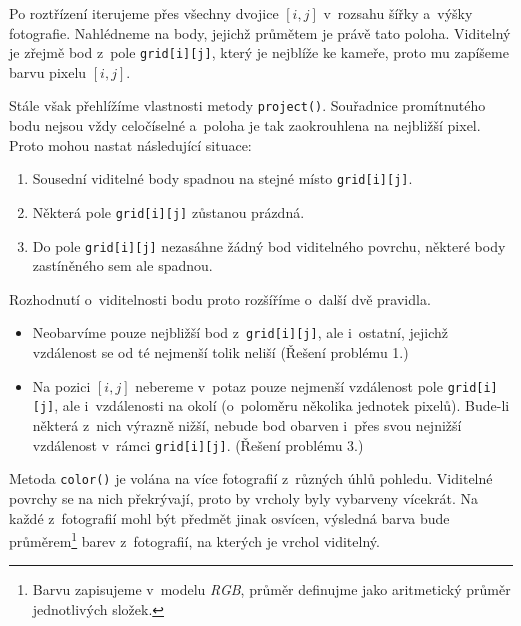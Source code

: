 \documentclass[12pt]{report}			%
\begin{document}
                        Po roztřízení iterujeme přes všechny dvojice $[i,j]$ v~rozsahu šířky a~výšky fotografie. Nahlédneme na body, jejichž průmětem je právě tato poloha. Viditelný je zřejmě bod z~pole \verb|grid[i][j]|, který je nejblíže ke kameře, proto mu zapíšeme barvu pixelu $[i,j]$.
    
                        Stále však přehlížíme vlastnosti metody \verb|project()|. Souřadnice promítnutého bodu nejsou vždy celočíselné a~poloha je tak zaokrouhlena na nejbližší pixel. Proto mohou nastat následující situace:

                        \begin{enumerate}
                            \item Sousední viditelné body spadnou na stejné místo \verb|grid[i][j]|.
                            \item Některá pole \verb|grid[i][j]| zůstanou prázdná.
                            \item Do pole \verb|grid[i][j]| nezasáhne žádný bod viditelného povrchu, některé body zastíněného sem ale spadnou.
                            \end{enumerate}
    
                        Rozhodnutí o~viditelnosti bodu proto rozšíříme o~další dvě pravidla.
                        \begin{itemize}
                            \item Neobarvíme pouze nejbližší bod z~\verb|grid[i][j]|, ale i~ostatní, jejichž vzdálenost se od té nejmenší tolik neliší (Řešení problému 1.)
                            \item Na pozici $[i,j]$ nebereme v~potaz pouze nejmenší vzdálenost pole \verb|grid[i][j]|, ale i~vzdálenosti na okolí (o~poloměru několika jednotek pixelů). Bude-li některá z~nich výrazně nižší, nebude bod obarven i~přes svou nejnižší vzdálenost v~rámci \verb|grid[i][j]|. (Řešení problému 3.)
                        \end{itemize}

                        Metoda \verb|color()| je volána na více fotografií z~různých úhlů pohledu. Viditelné povrchy se na nich překrývají, proto by vrcholy byly vybarveny vícekrát. Na každé z~fotografií mohl být předmět jinak osvícen, výsledná barva bude průměrem\footnote{Barvu zapisujeme v~modelu \emph{RGB}, průměr definujme jako aritmetický průměr jednotlivých složek.} barev z~fotografií, na kterých je vrchol viditelný.
\end{document}
